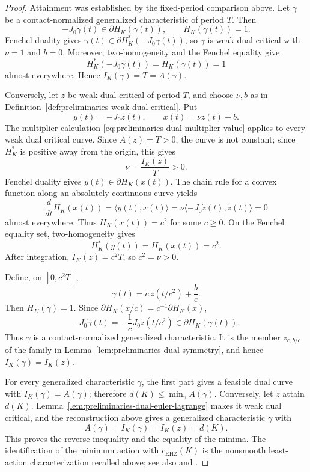 \begin{proof}
Attainment was established by the fixed-period comparison above.
Let \(\gamma\) be a contact-normalized generalized characteristic of period
\(T\).  Then
\[
  -J_0\dot\gamma(t)\in\partial H_K(\gamma(t)),
  \qquad H_K(\gamma(t))=1.
\]
Fenchel duality gives
\(\gamma(t)\in\partial H_K^*(-J_0\dot\gamma(t))\), so \(\gamma\) is weak
dual critical with \(\nu=1\) and \(b=0\).  Moreover, two-homogeneity and the
Fenchel equality give
\[
  H_K^*(-J_0\dot\gamma(t))=H_K(\gamma(t))=1
\]
almost everywhere.  Hence \(I_K(\gamma)=T=A(\gamma)\).

Conversely, let \(z\) be weak dual critical of period \(T\), and choose
\(\nu,b\) as in Definition~\ref{def:preliminaries-weak-dual-critical}.  Put
\[
  y(t)=-J_0\dot z(t),
  \qquad x(t)=\nu z(t)+b.
\]
The multiplier calculation \eqref{eq:preliminaries-dual-multiplier-value}
applies to every weak dual critical curve.  Since \(A(z)=T>0\), the curve is
not constant; since \(H_K^*\) is positive away from the origin, this gives
\[
  \nu=\frac{I_K(z)}{T}>0.
\]
Fenchel duality gives \(y(t)\in\partial H_K(x(t))\).  The chain rule for a
convex function along an absolutely continuous curve yields
\[
  \frac{d}{dt}H_K(x(t))
  =\langle y(t),\dot x(t)\rangle
  =\nu\langle-J_0\dot z(t),\dot z(t)\rangle
  =0
\]
almost everywhere.  Thus \(H_K(x(t))=c^2\) for some \(c\geq0\).  On the
Fenchel equality set, two-homogeneity gives
\[
  H_K^*(y(t))=H_K(x(t))=c^2.
\]
After integration, \(I_K(z)=c^2T\), so \(c^2=\nu>0\).

Define, on \([0,c^2T]\),
\[
  \gamma(t)
  =c\,z(t/c^2)+\frac{b}{c}.
\]
Then \(H_K(\gamma)=1\).  Since
\(\partial H_K(x/c)=c^{-1}\partial H_K(x)\),
\[
  -J_0\dot\gamma(t)
  =-\frac1cJ_0\dot z(t/c^2)
  \in\partial H_K(\gamma(t)).
\]
Thus \(\gamma\) is a contact-normalized generalized characteristic.  It is
the member \(z_{c,b/c}\) of the family in
Lemma~\ref{lem:preliminaries-dual-symmetry}, and hence
\(I_K(\gamma)=I_K(z)\).

For every generalized characteristic \(\gamma\), the first part gives a
feasible dual curve with \(I_K(\gamma)=A(\gamma)\); therefore
\(d(K)\leq\min_\gamma A(\gamma)\).  Conversely, let \(z\) attain \(d(K)\).
Lemma~\ref{lem:preliminaries-dual-euler-lagrange} makes it weak dual critical,
and the reconstruction above gives a generalized characteristic \(\gamma\)
with
\[
  A(\gamma)=I_K(\gamma)=I_K(z)=d(K).
\]
This proves the reverse inequality and the equality of the minima.  The
identification of the minimum action with \(c_{\mathrm{EHZ}}(K)\) is the
nonsmooth least-action characterization recalled above; see also
\cite[Proposition~2.7 and Lemma~5.1]{AAO2014} and
\cite[Lemma~2.1]{HK2017}.
\end{proof}

